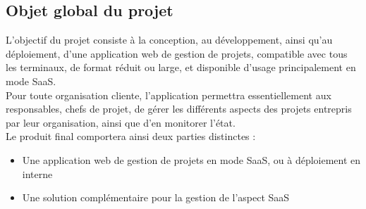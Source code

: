 \begin{spacing}{1.5}
\subsection{Objet global du projet}
L'objectif du projet consiste à la conception, au développement, ainsi qu’au déploiement, d’une application web de gestion de projets, compatible avec tous les terminaux, de format réduit ou large, et disponible d’usage principalement en mode SaaS.\\
Pour toute organisation cliente, l’application permettra essentiellement aux responsables, chefs de projet, de gérer les différents aspects des projets entrepris par leur organisation, ainsi que d’en monitorer l’état.\\

Le produit final comportera ainsi deux parties distinctes :
\begin{itemize}
\item Une application web de gestion de projets en mode SaaS, ou à déploiement en interne
    \item Une solution complémentaire pour la gestion de l’aspect SaaS
\end{itemize}


\end{spacing}
